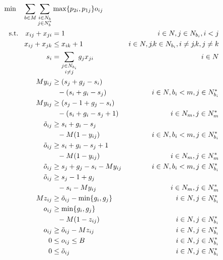 \documentclass{article}
\begin{document}
\begin{align}
    \text{min}\quad \sum_{b\in M}\sum_{\substack{i\in N_b\\j\in N_b^*}} 
            &\max\{p_{2i},p_{1j}\}o_{ij} \label{objfunc}\\
    \text{s.t.} \quad x_{ij} + x_{ji} &= 1 &i\in N, j\in N_{b_i}, i<j 
            \label{con:reflex}\\
    x_{ij} + x_{jk} &\leq x_{ik} + 1 
            &i\in N, j\!,\!k\in N_{b_i},i\neq j\!,\!k ,j\neq k 
            \label{con:transitiv} \\
    s_i &= \sum_{\substack{j\in N_{b_i}\\i\neq j}} g_j x_{ji} &i\in N 
            \label{con:start} \\
    My_{ij} &\ge (s_j+g_j-s_i) \notag\\
            &\phantom{=} - (s_i+g_i-s_j) &i\in N, b_i<m, j\in N_{b_i}^* 
            \label{con:y1} \\
    My_{ij} &\ge (s_j-1+g_j-s_i) \notag\\
            &\phantom{=} - (s_i+g_i-s_j+1) &i\in N_m, j\in N_m^*
            \label{con:y2} \\
    \tilde{o}_{ij} &\ge s_i+g_i - s_j \notag\\
                   &\phantom{=} - M(1-y_{ij}) &i\in N, b_i<m, j\in 
                    N_{b_i}^* \label{con:maxij1} \\
    \tilde{o}_{ij} &\ge s_i+g_i - s_j+1 \notag\\
                   &\phantom{=} - M(1-y_{ij}) &i\in N_m, j\in N_m^* 
                    \label{con:maxij2} \\
    \tilde{o}_{ij} &\ge s_j+g_j - s_i - My_{ij} &i\in N, b_i<m, j\in 
                    N_{b_i}^* \label{con:maxji1} \\
    \tilde{o}_{ij} &\ge s_j-1+g_j \notag\\
                   &\phantom{=} - s_i - My_{ij} &i\in N_m, j\in N_m^* 
                    \label{con:maxji2} \\
    Mz_{ij} &\ge \tilde{o}_{ij} - \min\{g_i,g_j\} &i\in N, j\in N_{b_i}^* 
                    \label{con:z} \\
    o_{ij} &\ge \min\{g_i,g_j\} \notag\\
           &\phantom{=} - M(1-z_{ij}) &i\in N, j\in N_{b_i}^* 
                    \label{con:overlay1} \\
    o_{ij} &\ge \tilde{o}_{ij} - Mz_{ij} &i\in N, j\in N_{b_i}^*
                    \label{con:overlay2} \\
    0 &\leq o_{ij} \leq B &i\in N, j\in N_{b_i}^* \label{con:range} \\
    0 &\leq \tilde{o}_{ij} &i\in N, j\in N_{b_i}^* \label{con:range2}
\end{align}
\end{document}
